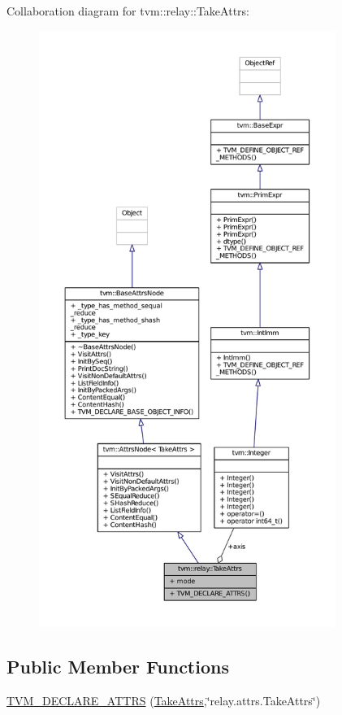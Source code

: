 Collaboration diagram for tvm\+:\+:relay\+:\+:Take\+Attrs\+:
\nopagebreak
\begin{figure}[H]
\begin{center}
\leavevmode
\includegraphics[height=550pt]{structtvm_1_1relay_1_1TakeAttrs__coll__graph}
\end{center}
\end{figure}
\subsection*{Public Member Functions}
\begin{DoxyCompactItemize}
\item 
\hyperlink{structtvm_1_1relay_1_1TakeAttrs_aa848b10dddc041c3620bc823046b04ca}{T\+V\+M\+\_\+\+D\+E\+C\+L\+A\+R\+E\+\_\+\+A\+T\+T\+RS} (\hyperlink{structtvm_1_1relay_1_1TakeAttrs}{Take\+Attrs},\char`\"{}relay.\+attrs.\+Take\+Attrs\char`\"{})
\end{DoxyCompactItemize}
